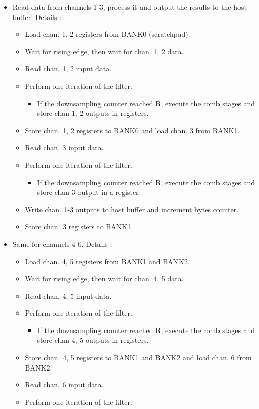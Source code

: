 \documentclass[]{report}
\providecommand{\tightlist}{%
	\setlength{\itemsep}{0pt}\setlength{\parskip}{0pt}}
\begin{document}
\begin{itemize}
\tightlist
\item
  Read data from channels 1-3, process it and output the results to the
  host buffer. Details :

  \begin{itemize}
  \tightlist
  \item
    Load chan. 1, 2 registers from BANK0 (scratchpad).
  \item
    Wait for rising edge, then wait for chan. 1, 2 data.
  \item
    Read chan. 1, 2 input data.
  \item
    Perform one iteration of the filter.

    \begin{itemize}
    \tightlist
    \item
      If the downsampling counter reached R, execute the comb stages and
      store chan 1, 2 outputs in registers.
    \end{itemize}
  \item
    Store chan. 1, 2 registers to BANK0 and load chan. 3 from BANK1.
  \item
    Read chan. 3 input data.
  \item
    Perform one iteration of the filter.

    \begin{itemize}
    \tightlist
    \item
      If the downsampling counter reached R, execute the comb stages and
      store chan 3 output in a register.
    \end{itemize}
  \item
    Write chan. 1-3 outputs to host buffer and increment bytes counter.
  \item
    Store chan. 3 registers to BANK1.
  \end{itemize}
\item
  Same for channels 4-6. Details :

  \begin{itemize}
  \tightlist
  \item
    Load chan. 4, 5 registers from BANK1 and BANK2.
  \item
    Wait for rising edge, then wait for chan. 4, 5 data.
  \item
    Read chan. 4, 5 input data.
  \item
    Perform one iteration of the filter.

    \begin{itemize}
    \tightlist
    \item
      If the downsampling counter reached R, execute the comb stages and
      store chan 4, 5 outputs in registers.
    \end{itemize}
  \item
    Store chan. 4, 5 registers to BANK1 and BANK2 and load chan. 6 from
    BANK2.
  \item
    Read chan. 6 input data.
  \item
    Perform one iteration of the filter.


\end{itemize}
\end{itemize}
\end{document}
